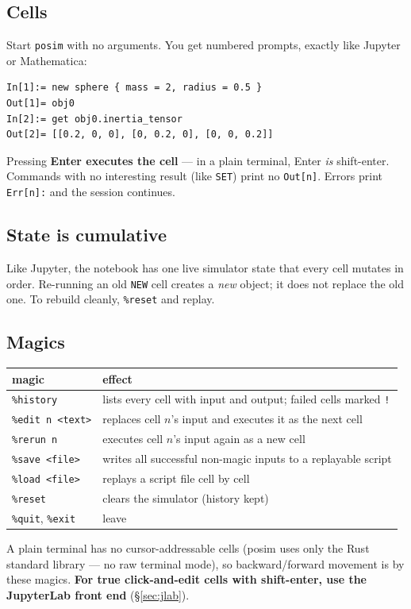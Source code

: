 \documentclass[11pt]{article}
\newcommand{\kw}[1]{\texttt{\uppercase{#1}}}
\newcommand{\code}[1]{\texttt{#1}}
\begin{document}
\subsection{Cells}
Start \code{posim} with no arguments. You get numbered prompts, exactly
like Jupyter or Mathematica:
\begin{lstlisting}
In[1]:= new sphere { mass = 2, radius = 0.5 }
Out[1]= obj0
In[2]:= get obj0.inertia_tensor
Out[2]= [[0.2, 0, 0], [0, 0.2, 0], [0, 0, 0.2]]
\end{lstlisting}
Pressing \textbf{Enter executes the cell} --- in a plain terminal, Enter
\emph{is} shift-enter. Commands with no interesting result (like
\kw{set}) print no \code{Out[n]}. Errors print \code{Err[n]:} and the
session continues.

\subsection{State is cumulative}
Like Jupyter, the notebook has one live simulator state that every cell
mutates in order. Re-running an old \kw{new} cell creates a \emph{new}
object; it does not replace the old one. To rebuild cleanly,
\code{\%reset} and replay.

\subsection{Magics}\label{sec:magics}
\begin{center}
\begin{tabular}{lp{9.8cm}}
\textbf{magic} & \textbf{effect}\\\hline
\code{\%history} & lists every cell with input and output; failed cells marked \code{!}\\
\code{\%edit n <text>} & replaces cell $n$'s input and executes it as the next cell\\
\code{\%rerun n} & executes cell $n$'s input again as a new cell\\
\code{\%save <file>} & writes all successful non-magic inputs to a replayable script\\
\code{\%load <file>} & replays a script file cell by cell\\
\code{\%reset} & clears the simulator (history kept)\\
\code{\%quit}, \code{\%exit} & leave\\
\end{tabular}
\end{center}

A plain terminal has no cursor-addressable cells (posim uses only the
Rust standard library --- no raw terminal mode), so backward/forward
movement is by these magics. \textbf{For true click-and-edit cells with
shift-enter, use the JupyterLab front end} (\S\ref{sec:jlab}).
\end{document}
